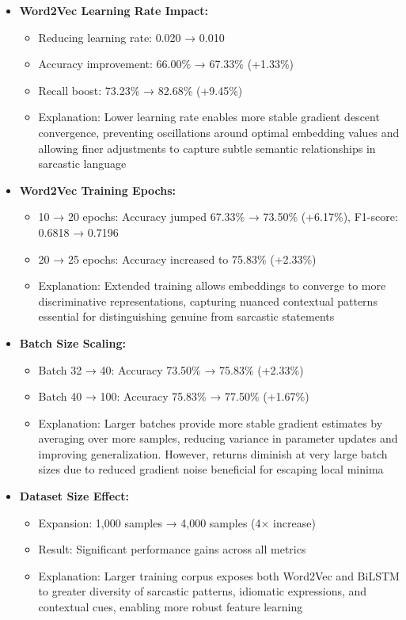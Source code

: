 \documentclass[11pt]{article}
\begin{document}
\begin{itemize}
    \item \textbf{Word2Vec Learning Rate Impact:}
    \begin{itemize}
        \item Reducing learning rate: 0.020 → 0.010
        \item Accuracy improvement: 66.00\% → 67.33\% (+1.33\%)
        \item Recall boost: 73.23\% → 82.68\% (+9.45\%)
        \item Explanation: Lower learning rate enables more stable gradient descent convergence, preventing oscillations around optimal embedding values and allowing finer adjustments to capture subtle semantic relationships in sarcastic language
    \end{itemize}
    
    \item \textbf{Word2Vec Training Epochs:}
    \begin{itemize}
        \item 10 → 20 epochs: Accuracy jumped 67.33\% → 73.50\% (+6.17\%), F1-score: 0.6818 → 0.7196
        \item 20 → 25 epochs: Accuracy increased to 75.83\% (+2.33\%)
        \item Explanation: Extended training allows embeddings to converge to more discriminative representations, capturing nuanced contextual patterns essential for distinguishing genuine from sarcastic statements
    \end{itemize}
    
    \item \textbf{Batch Size Scaling:}
    \begin{itemize}
        \item Batch 32 → 40: Accuracy 73.50\% → 75.83\% (+2.33\%)
        \item Batch 40 → 100: Accuracy 75.83\% → 77.50\% (+1.67\%)
        \item Explanation: Larger batches provide more stable gradient estimates by averaging over more samples, reducing variance in parameter updates and improving generalization. However, returns diminish at very large batch sizes due to reduced gradient noise beneficial for escaping local minima
    \end{itemize}
    
    \item \textbf{Dataset Size Effect:}
    \begin{itemize}
        \item Expansion: 1,000 samples → 4,000 samples (4× increase)
        \item Result: Significant performance gains across all metrics
        \item Explanation: Larger training corpus exposes both Word2Vec and BiLSTM to greater diversity of sarcastic patterns, idiomatic expressions, and contextual cues, enabling more robust feature learning
    \end{itemize}
    

\end{itemize}
\end{document}

